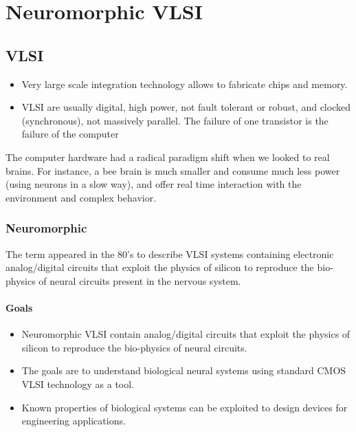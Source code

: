 \documentclass[main]{subfiles}
\begin{document}

\section{Neuromorphic VLSI}
\subsection{VLSI}
\begin{itemize}
	\item Very large scale integration technology allows to fabricate chips and memory.
	\item VLSI are usually digital, high power, not fault tolerant or robust, and clocked (synchronous), not massively parallel.
	\subitem The failure of one transistor is the failure of the computer
\end{itemize}

The computer hardware had a radical paradigm shift when we looked to real brains. For instance, a bee brain is much smaller and consume much less power (using neurons in a slow way), and offer real time interaction with the environment and complex behavior.

\subsubsection{Neuromorphic}
The term appeared in the 80's to describe VLSI systems containing electronic analog/digital circuits that exploit the physics of silicon to reproduce the bio-physics of neural circuits present in the nervous system.
\paragraph{Goals}
\begin{itemize}[noitemsep,nolistsep]
	\item Neuromorphic VLSI contain analog/digital circuits that exploit the physics of silicon to reproduce the bio-physics of neural circuits.
	\item The goals are to understand biological neural systems using standard CMOS VLSI technology as a tool.
	\item Known properties of biological systems can be exploited to design devices for engineering applications.
\end{itemize}
\end{document}
